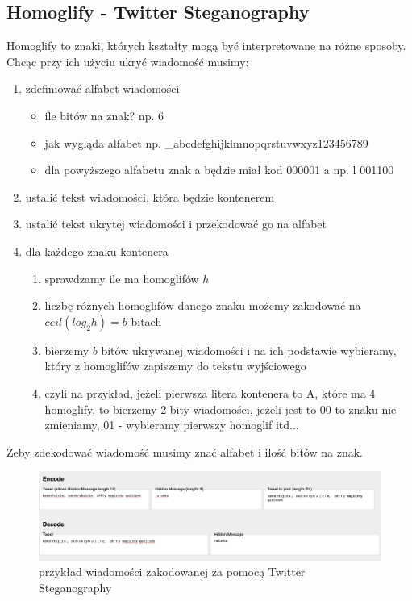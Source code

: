 \documentclass{article}
\begin{document}
\subsection{Homoglify - Twitter Steganography}
Homoglify to znaki, których kształty mogą być interpretowane na różne sposoby.  Chcąc przy ich użyciu ukryć wiadomość musimy:
\begin{enumerate}
	\item zdefiniować alfabet wiadomości 
	\begin{itemize}
		\item ile bitów na znak? np.  6
		\item jak wygląda alfabet np.   \_abcdefghijklmnopqrstuvwxyz123456789
		\item dla powyższego alfabetu znak a będzie miał kod 000001 a np.  l 001100
	\end{itemize}
	\item ustalić tekst wiadomości, która będzie kontenerem
	\item ustalić tekst ukrytej wiadomości i przekodować go na alfabet
	\item dla każdego znaku kontenera
	\begin{enumerate}
		\item sprawdzamy ile ma homoglifów $h$
		\item liczbę różnych homoglifów danego znaku możemy zakodować na $ceil(log_2 h) = b$ bitach
		\item bierzemy $b$ bitów ukrywanej wiadomości i na ich podstawie wybieramy, który z homoglifów zapiszemy do tekstu wyjściowego
		\item czyli na przykład, jeżeli pierwsza litera kontenera to A, które ma 4 homoglify, to bierzemy 2 bity wiadomości, jeżeli jest to 00 to znaku nie zmieniamy, 01 - wybieramy pierwszy homoglif itd...
	\end{enumerate}
\end{enumerate}
Żeby zdekodować wiadomość musimy znać alfabet i ilość bitów na znak.
\begin{figure}[H]
	\centering
	\includegraphics[width=12cm]{homoglify}
	\caption{przykład wiadomości zakodowanej za pomocą Twitter Steganography}
\end{figure}
\end{document}
